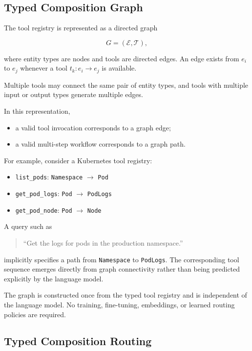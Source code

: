\subsection{Typed Composition Graph}
\label{sec:typed-graph}

The tool registry is represented as a directed graph

\[
G=(\mathcal{E},\mathcal{T}),
\]

where entity types are nodes and tools are directed edges.
An edge exists from $e_i$ to $e_j$ whenever a tool
$t_k:e_i\rightarrow e_j$
is available.

Multiple tools may connect the same pair of entity types, and tools with multiple input or output types generate multiple edges.

In this representation,

\begin{itemize}
\item a valid tool invocation corresponds to a graph edge;
\item a valid multi-step workflow corresponds to a graph path.
\end{itemize}

For example, consider a Kubernetes tool registry:

\begin{itemize}
    \item \texttt{list\_pods}: \texttt{Namespace} $\rightarrow$ \texttt{Pod}
    \item \texttt{get\_pod\_logs}: \texttt{Pod} $\rightarrow$ \texttt{PodLogs}
    \item \texttt{get\_pod\_node}: \texttt{Pod} $\rightarrow$ \texttt{Node}
\end{itemize}

A query such as

\begin{quote}
``Get the logs for pods in the production namespace.''
\end{quote}

implicitly specifies a path from
\texttt{Namespace}
to
\texttt{PodLogs}.
The corresponding tool sequence emerges directly from graph connectivity rather than being predicted explicitly by the language model.

The graph is constructed once from the typed tool registry and is independent of the language model.
No training, fine-tuning, embeddings, or learned routing policies are required.

\subsection{Typed Composition Routing}
\label{sec:tcr}

